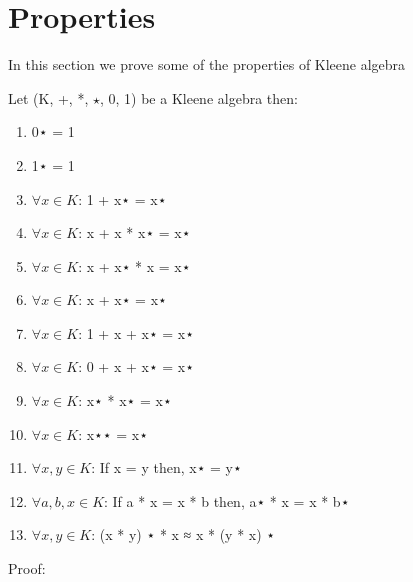 \section{Properties}
In this section we prove some of the properties of Kleene algebra

Let (K, +, *, \(\star\), 0, 1) be a Kleene algebra then:
\begin{enumerate}
\item 0⋆ = 1
\item 1⋆ = 1
\item \(\forall x \in K\): 1 + x⋆ = x⋆
\item \(\forall x \in K\): x + x * x⋆ = x⋆
\item \(\forall x \in K\): x + x⋆ * x = x⋆
\item \(\forall x \in K\): x + x⋆ = x⋆
\item \(\forall x \in K\): 1 + x + x⋆ = x⋆
\item \(\forall x \in K\): 0 + x + x⋆ = x⋆
\item \(\forall x \in K\): x⋆ * x⋆ = x⋆
\item \(\forall x \in K\): x⋆⋆ = x⋆
\item \(\forall x , y \in K\): If x = y then, x⋆ = y⋆
\item \(\forall a, b, x \in K\): If a * x = x * b then, a⋆ * x = x * b⋆
\item \(\forall x, y \in K\): (x * y) ⋆ * x ≈ x * (y * x) ⋆
\end{enumerate}
Proof:
